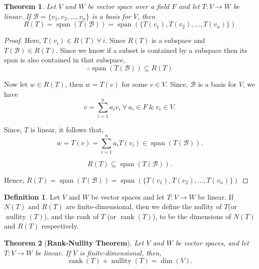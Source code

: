 \documentclass[12pt, a4paper]{article}
\newtheorem{theorem}{Theorem}[section]
\theoremstyle{definition}
\newtheorem{definition}{Definition}[section]
\theoremstyle{remark}
\newcommand{\B}{\mathscr{B}}
\DeclareMathOperator{\Span}{span}
\DeclareMathOperator{\nullity}{nullity}
\DeclareMathOperator{\rank}{rank}
\begin{document}
\begin{theorem}
    Let $V$ and $W$ be vector space over a field $F$ and let $T:V \to W$ be linear. If $\B = \{v_1,v_2,\ldots,v_n\}$ is a basis for $V$, then
    \[
    R(T) = \Span(T(\B)) = \Span(\{T(v_1), T(v_2), \ldots, T(v_n)\})
    \]
\end{theorem}

\begin{proof}
    Here, $T(v_i) \in R(T) \ \forall \ i$. Since $R(T)$ is a subspace and $T(\B) \in R(T)$. Since we know if a subset is contained by a subspace then its span is also contained in that subspace,
    $$\therefore \Span(T(\B)) \subseteq R(T)$$

    Now let $w \in R(T)$, then $w = T(v)$ for some $v \in V$. Since, $\B$ is a basis for $V$, we have
    $$v = \sum_{i=1}^{n} a_i v_i \ \forall \ a_i \in F \ \& \ v_i \in V.$$

    Since, $T$ is linear, it follows that,
    $$w = T(v) = \sum_{i=1}^{n} a_i T(v_i) \in \Span(T(\B)).$$

    $$R(T) \subseteq \Span(T(\B)).$$

    Hence, $R(T) = \Span(T(\B)) = \Span(\{T(v_1), T(v_2), \dots, T(v_n)\})$
\end{proof}

\begin{definition}
    Let $V$ and $W$ be vector spaces and let $T:V \to W$ be linear. If $N(T) \text{ and } R(T)$ are finite-dimensional, then we define the nullity of $T$(or $\nullity(T)$), and the rank of $T$ (or $\rank(T)$), to be the dimensions of $N(T)$ and $R(T)$ respectively.
\end{definition}

\begin{theorem}[\textbf{Rank-Nullity Theorem}]
    Let $V$ and $W$ be vector spaces, and let $T: V \to W$ be linear. If $V$ is finite-dimensional, then,
    $$\rank(T) + \nullity(T) = \dim(V).$$
\end{theorem}
\end{document}
